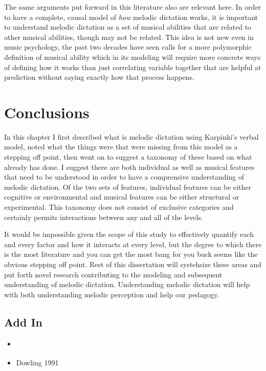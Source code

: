 \documentclass[]{book}
\providecommand{\tightlist}{%
  \setlength{\itemsep}{0pt}\setlength{\parskip}{0pt}}
\theoremstyle{definition}
\theoremstyle{definition}
\theoremstyle{definition}
\theoremstyle{remark}
\begin{document}
The same arguments put forward in this literature also are relevant
here. In order to have a complete, causal model of \emph{how} melodic
dictation works, it is important to understand melodic dictation as a
set of musical abilities that are related to other musical abilities,
though may not be related. This idea is not new even in music
psychology, the past two decades have seen calls for a more polymorphic
definition of musical ability
\citep{levitinWhatDoesIt2012, peretzModularityMusicProcessing2003} which
in its modeling will require more concrete ways of defining how it works
than just correlating variable together that are helpful at prediction
without saying exactly how that process happens.

\hypertarget{conclusions}{%
\section{Conclusions}\label{conclusions}}

In this chapter I first described what is melodic dictation using
Karpinki's verbal model, noted what the things were that were missing
from this model as a stepping off point, then went on to suggest a
taxonomy of these based on what already has done. I suggest there are
both individual as well as musical features that need to be understood
in order to have a comprensive understanding of melodic dictation. Of
the two sets of features, individual features can be either cognitive or
environmental and musical features can be either structural or
experimental. This taxonomy does not consist of exclusive categories and
certainly permits interactions between any and all of the levels.

It would be impossible given the scope of this study to effectively
quantify each and every factor and how it interacts at every level, but
the degree to which there is the most literature and you can get the
most bang for you buck seems like the obvious stepping off point. Rest
of this dissertation will systehsize these areas and put forth novel
research contributing to the modeling and subsequent understanding of
melodic dictation. Understanding melodic dictation will help with both
understanding melodic perception and help our pedagogy.

\hypertarget{add-in}{%
\subsection{Add In}\label{add-in}}

\begin{itemize}
\tightlist
\item
  \citep{hansenWorkingMemoryMusical2013}
\item
  Dowling 1991 \citep{dowlingTonalStrengthMelody1991}
\end{itemize}
\end{document}
